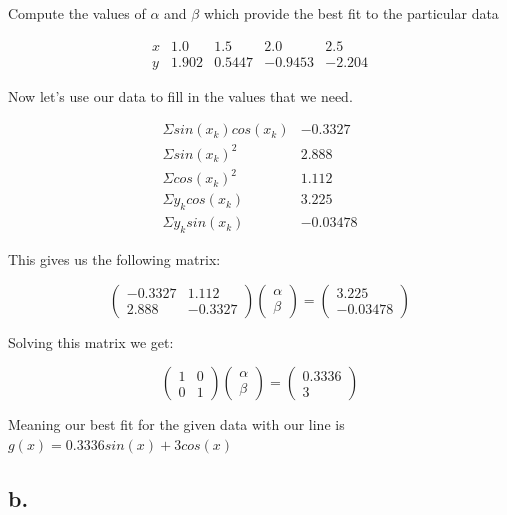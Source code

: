 \documentclass[]{article}
\begin{document}
Compute the values of \(\alpha\) and \(\beta\) which provide the best
fit to the particular data

\[
\begin{array}{c|c|c|c|c} 
x & 1.0 & 1.5 & 2.0 & 2.5\\
y & 1.902 & 0.5447 & -0.9453 & -2.204
\end{array}
\]

Now let's use our data to fill in the values that we need.

\[
\begin{array}{c|c|} 
\Sigma sin(x_k)cos(x_k) & -0.3327\\
\Sigma sin(x_k)^2 & 2.888\\
\Sigma cos(x_k)^2 & 1.112\\
\Sigma y_kcos(x_k) & 3.225\\
\Sigma y_ksin(x_k) & -0.03478
\end{array}
\]

This gives us the following matrix:

\[
\left(\begin{array}{cc} 
-0.3327 & 1.112\\
2.888 & -0.3327
\end{array}\right)
\left(\begin{array}{c} 
\alpha \\
\beta 
\end{array}\right) =
\left(\begin{array}{c}
3.225 \\
-0.03478 
\end{array}\right)
\]

Solving this matrix we get:

\[
\left(\begin{array}{cc} 
1 & 0\\
0 & 1
\end{array}\right)
\left(\begin{array}{c} 
\alpha \\
\beta 
\end{array}\right) =
\left(\begin{array}{c}
0.3336 \\
3 
\end{array}\right)
\]

Meaning our best fit for the given data with our line is
\(g(x) = 0.3336sin(x) +3cos(x)\)

\subsection{b.}\label{b.}
\end{document}
